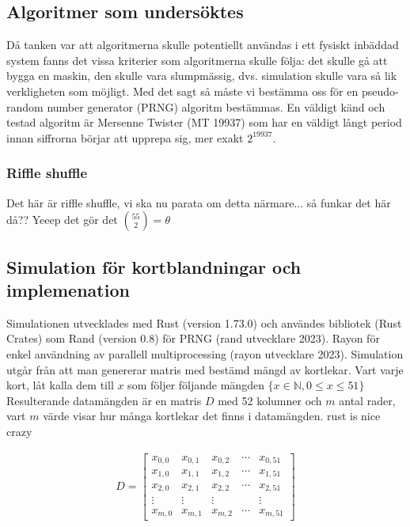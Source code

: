 \documentclass[a4paper]{article}
\begin{document}
\subsection{Algoritmer som undersöktes}

Då tanken var att  algoritmerna skulle potentiellt användas i ett fysiskt
inbäddad system fanns det vissa  kriterier som algoritmerna skulle följa: det
skulle gå att bygga en maskin, den skulle vara slumpmässig, dvs. simulation
skulle vara så lik verkligheten som möjligt. Med det sagt så måste vi bestämma
oss för en pseudo-random number generator (PRNG) algoritm bestämmas. En väldigt
känd och testad algoritm är Mersenne Twister (MT 19937) som har en väldigt långt
period innan siffrorna börjar att upprepa sig, mer exakt $2^{19937}$.

\subsubsection{Riffle shuffle}
Det här är riffle shuffle, vi ska nu parata om detta närmare...
så funkar det här då?? Yeeep det gör det $\binom{55}{2} = \theta$
\subsection{Simulation för kortblandningar och implemenation}
\label{sec:poker_test}

Simulationen utvecklades med Rust (version 1.73.0) och användes bibliotek (Rust
Crates) som Rand (version 0.8) för PRNG (rand utvecklare 2023). Rayon för enkel
användning av  parallell multiprocessing (rayon utvecklare 2023). Simulation
utgår från att man genererar matris med bestämd mängd av kortlekar. Vart varje
kort, låt kalla dem till $x$ som följer följande mängden $\{x \in \mathbb{N},  0 \leq x \leq 51 \}$
Resulterande datamängden är en matris $D$ med 52 kolumner och $m$ antal rader, vart
$m$ värde visar hur många kortlekar det finns i datamängden.
rust is nice crazy

\begin{align}
	D = \begin{bmatrix}
		x_{0,0} & x_{0,1} & x_{0,2} & \cdots & x_{0,51}\\ 
		x_{1,0} & x_{1,1} & x_{1,2} & \cdots & x_{1,51}\\
		x_{2,0} & x_{2,1} & x_{2,2} & \cdots & x_{2,51}\\
		\vdots & \vdots & \vdots & \; & \vdots \\
		x_{m,0} & x_{m,1} & x_{m,2} & \cdots & x_{m,51}
	\end{bmatrix}
\end{align}
\end{document}
